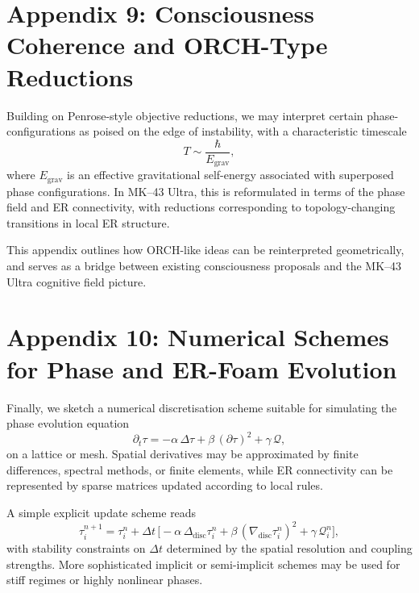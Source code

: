 \chapter{Appendix 9: Consciousness Coherence and ORCH-Type Reductions}

Building on Penrose-style objective reductions, we may interpret certain phase-configurations as poised on the edge of instability, with a characteristic timescale
\[
T \sim \frac{\hbar}{E_{\mathrm{grav}}},
\]
where \(E_{\mathrm{grav}}\) is an effective gravitational self-energy associated with superposed phase configurations.
In MK--43 Ultra, this is reformulated in terms of the phase field and ER connectivity, with reductions corresponding to topology-changing transitions in local ER structure.

This appendix outlines how ORCH-like ideas can be reinterpreted geometrically, and serves as a bridge between existing consciousness proposals and the MK--43 Ultra cognitive field picture.

\chapter{Appendix 10: Numerical Schemes for Phase and ER-Foam Evolution}

Finally, we sketch a numerical discretisation scheme suitable for simulating the phase evolution equation
\[
\partial_t \tau = -\alpha\,\Delta\tau + \beta\,(\partial\tau)^2 + \gamma\,\mathcal{Q},
\]
on a lattice or mesh.
Spatial derivatives may be approximated by finite differences, spectral methods, or finite elements, while ER connectivity can be represented by sparse matrices updated according to local rules.

A simple explicit update scheme reads
\[
\tau^{n+1}_i = \tau^n_i + \Delta t\,
\Big[-\alpha\,\Delta_{\mathrm{disc}}\tau^n_i
      + \beta\,(\nabla_{\mathrm{disc}}\tau^n_i)^2
      + \gamma\,\mathcal{Q}^n_i\Big],
\]
with stability constraints on \(\Delta t\) determined by the spatial resolution and coupling strengths.
More sophisticated implicit or semi-implicit schemes may be used for stiff regimes or highly nonlinear phases.
